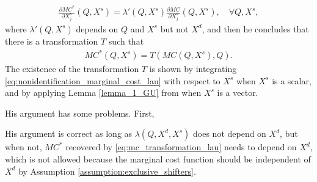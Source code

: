 \documentclass[11pt, a4paper]{article}
\theoremstyle{remark}
\begin{document}
\begin{align}
    \frac{\partial MC^{*}}{\partial X^{s}_j}(Q, X^{s}) = \lambda'(Q, X^{s}) \frac{\partial MC}{\partial X^{s}_j}(Q, X^{s}),\quad \forall Q, X^{s}, \label{eq:nonidentification_marginal_cost_lau}
\end{align}
where $\lambda'(Q, X^{s})$ depends on $Q$ and $X^{s}$ but not $X^{d}$, and then he concludes that there is a transformation $T$ such that 
\begin{align}
    MC^{*}(Q, X^{s}) = T(MC(Q, X^{s}), Q). \label{eq:mc_transformation_lau}
\end{align}
The existence of the transformation $T$ is shown by integrating \eqref{eq:nonidentification_marginal_cost_lau} with respect to $X^{s}$ when $X^{s}$ is a scalar, and by applying Lemma \ref{lemma_1_GU} from \citet{goldmanNote1964} when $X^{s}$ is a vector.

His argument has some problems.
First, 


His argument is correct as long as $\lambda(Q, X^{d}, X^{s})$ does not depend on $X^{d}$, but when not, $MC^{*}$ recovered by \eqref{eq:mc_transformation_lau} needs to depend on $X^{d}$, which is not allowed because the marginal cost function should be independent of $X^{d}$ by Assumption \ref{assumption:exclusive_shifters}.
\end{document}
